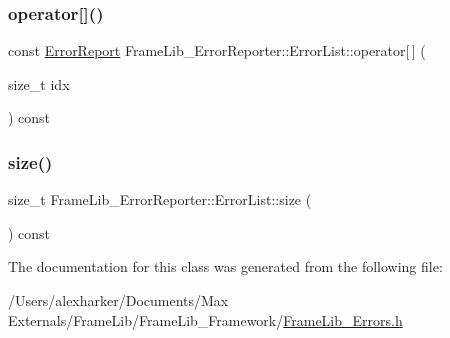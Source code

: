 \mbox{\label{class_frame_lib___error_reporter_1_1_error_list_a5a2d2275105cf1fc68a56c4a7b50f058}} 
\subsubsection{\texorpdfstring{operator[]()}{operator[]()}}
{\footnotesize\ttfamily const \hyperlink{class_frame_lib___error_reporter_1_1_error_report}{Error\+Report} Frame\+Lib\+\_\+\+Error\+Reporter\+::\+Error\+List\+::operator\mbox{[}$\,$\mbox{]} (\begin{DoxyParamCaption}\item[{size\+\_\+t}]{idx }\end{DoxyParamCaption}) const\hspace{0.3cm}{\ttfamily [inline]}}

\mbox{\label{class_frame_lib___error_reporter_1_1_error_list_a7566d9addd382eaf763abfe64c0dbc3a}} 
\subsubsection{\texorpdfstring{size()}{size()}}
{\footnotesize\ttfamily size\+\_\+t Frame\+Lib\+\_\+\+Error\+Reporter\+::\+Error\+List\+::size (\begin{DoxyParamCaption}{ }\end{DoxyParamCaption}) const\hspace{0.3cm}{\ttfamily [inline]}}



The documentation for this class was generated from the following file\+:\begin{DoxyCompactItemize}
\item 
/\+Users/alexharker/\+Documents/\+Max Externals/\+Frame\+Lib/\+Frame\+Lib\+\_\+\+Framework/\hyperlink{_frame_lib___errors_8h}{Frame\+Lib\+\_\+\+Errors.\+h}\end{DoxyCompactItemize}
